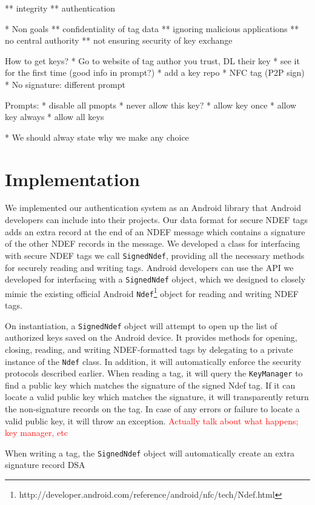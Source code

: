\documentclass[12pt]{article}
\newcommand\TODO[1]{\textcolor{red}{#1}}
\begin{document}
** integrity
** authentication

* Non goals
** confidentiality of tag data
** ignoring malicious applications
** no central authority
** not ensuring security of key exchange


How to get keys?
* Go to website of tag author you trust, DL their key
* see it for the first time (good info in prompt?)
* add a key repo
* NFC tag (P2P sign)
* No signature: different prompt

Prompts:
* disable all pmopts
* never allow this key?
* allow key once
* allow key always
* allow all keys

* We should alway state why we make any choice

\section{Implementation}
We implemented our authentication system as an Android library that Android developers can include into their projects.
Our data format for secure NDEF tags adds an extra record at the end of an NDEF message which contains a signature of the other NDEF records in the message.
We developed a class for interfacing with secure NDEF tags we call \texttt{SignedNdef}, providing all the necessary methods for securely reading and writing tags.
Android developers can use the API we developed for interfacing with a \texttt{SignedNdef} object, which we designed to closely mimic the existing official Android \texttt{Ndef}\footnote{http://developer.android.com/reference/android/nfc/tech/Ndef.html} object for reading and writing NDEF tags.

On instantiation, a \texttt{SignedNdef} object will attempt to open up the list of authorized keys saved on the Android device.
It provides methods for opening, closing, reading, and writing NDEF-formatted tags by delegating to a private instance of the \texttt{Ndef} class.
In addition, it will automatically enforce the security protocols described earlier.
When reading a tag, it will query the \texttt{KeyManager} to find a public key which matches the signature of the signed Ndef tag.
If it can locate a valid public key which matches the signature, it will transparently return the non-signature records on the tag.
In case of any errors or failure to locate a valid public key, it will throw an exception. \TODO{Actually talk about what happens; key manager, etc}

When writing a tag, the \texttt{SignedNdef} object will automatically create an extra signature record DSA
\end{document}
